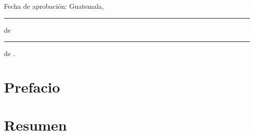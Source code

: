 \documentclass[11pt, letterpaper, twoside, openright]{report}
\newcommand{\defaultparformat}[1]{
	{\setlength{\parskip}{2ex}
     }
}
\begin{document}
	Fecha de aprobación: Guatemala, \rule[1pt]{0.5 in}{1pt} de \rule[1pt]{1 in}{1pt} de \anoaprobacion.
	\normalsize
\fi

\pagestyle{plain}
\ifdefined\CAPprefacio
	\newpage
	\cleardoublepage{}
    \chapter*{Prefacio}
    \ifdefined\parpordefecto
    	\defaultparformat{a-prefacio}
    \else
    	
    \fi
\fi

\ifdefined\CAPindice
	\newpage
    \cleardoublepage{}
	\renewcommand{\contentsname}{Índice}
    \pdfbookmark{\contentsname}{toc}
	\tableofcontents
\fi

\ifdefined\CAPfiguras
	\newpage
    \cleardoublepage{}
	\renewcommand{\listfigurename}{Lista de figuras}
	\listoffigures
\fi

\ifdefined\CAPcuadros
	\newpage
    \cleardoublepage{}
	\renewcommand{\listtablename}{Lista de cuadros}
	\listoftables
\fi

\ifdefined\CAPresumen
	\newpage
    \cleardoublepage{}
	\chapter*{Resumen}
	\ifdefined\parpordefecto
		\defaultparformat{b-resumen}
	\else
		
	\fi
\fi

\ifdefined\CAPabstract
	\newpage
    \cleardoublepage{}
\end{document}
